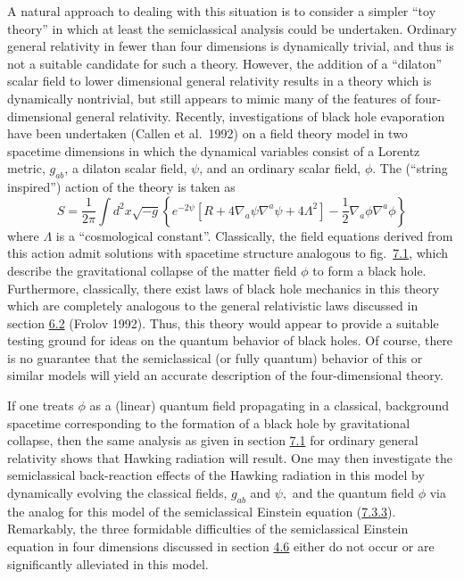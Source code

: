\documentclass[11pt,a4paper]{article}
\begin{document}
A natural approach to dealing with this situation is to consider a simpler ``toy theory'' in which at least the semiclassical analysis could be undertaken. Ordinary general relativity in fewer than four dimensions is dynamically trivial, and thus is not a suitable candidate for such a theory. However, the addition of a ``dilaton'' scalar field to lower dimensional general relativity results in a theory \hypertarget{source-199}{} which is dynamically nontrivial, but still appears to mimic many of the features of four-dimensional general relativity. Recently, investigations of black hole evaporation have been undertaken (Callen et al.~1992) on a field theory model in two spacetime dimensions in which the dynamical variables consist of a Lorentz metric, \(g_{ab}\), a dilaton scalar field, \(\psi\), and an ordinary scalar field, \(\phi\). The (``string inspired'') action of the theory is taken as
\begin{equation*}
S = \frac{1}{2\pi} \int d^2x \sqrt{-g} \left\{ e^{-2\psi} [R + 4\nabla_a \psi \nabla^a \psi + 4\Lambda^2] - \frac{1}{2} \nabla_a \phi \nabla^a \phi \right\} \tag{7.3.6}\label{eq:7.3.6}
\end{equation*}
where \(\Lambda\) is a ``cosmological constant''. Classically, the field equations derived from this action admit solutions with spacetime structure analogous to fig.~\hyperref[fig:7.1]{7.1}, which describe the gravitational collapse of the matter field \(\phi\) to form a black hole. Furthermore, classically, there exist laws of black hole mechanics in this theory which are completely analogous to the general relativistic laws discussed in section \hyperlink{sec:6.2}{6.2} (Frolov 1992). Thus, this theory would appear to provide a suitable testing ground for ideas on the quantum behavior of black holes. Of course, there is no guarantee that the semiclassical (or fully quantum) behavior of this or similar models will yield an accurate description of the four-dimensional theory.

If one treats \(\phi\) as a (linear) quantum field propagating in a classical, background spacetime corresponding to the formation of a black hole by gravitational collapse, then the same analysis as given in section \hyperlink{sec:7.1}{7.1} for ordinary general relativity shows that Hawking radiation will result. One may then investigate the semiclassical back-reaction effects of the Hawking radiation in this model by dynamically evolving the classical fields, \(g_{ab}\) and \(\psi,\) and the quantum field \(\phi\) via the analog for this model of the semiclassical Einstein equation (\hyperref[eq:7.3.3]{7.3.3}). Remarkably, the three formidable difficulties of the semiclassical Einstein equation in four dimensions discussed in section \hyperlink{sec:4.6}{4.6} either do not occur or are significantly alleviated in this model.
\end{document}
